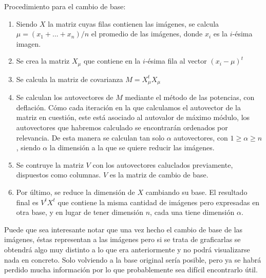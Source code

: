 \bigskip

Procedimiento para el cambio de base:

\begin{enumerate}
\item Siendo $X$ la matriz cuyas filas contienen las imágenes, se calcula $\mu = (x_1 + ... + x_n)/n$ el promedio de las imágenes, donde $x_i$ es la $i$-ésima imagen.
\item Se crea la matriz $X_\mu$ que contiene en la $i$-ésima fila al vector $(x_i - \mu)^t$
\item Se calcula la matriz de covarianza $M = X_\mu^tX_\mu$
\item Se calculan los autovectores de $M$ mediante el método de las potencias, con deflación. Cómo cada iteración en la que calculamos el autovector de la matriz en cuestión, este está asociado al autovalor de máximo módulo, los autovectores que habremos calculado se encontrarán ordenados por relevancia. De esta manera se calculan tan solo $\alpha$ autovectores, con $1 \geq \alpha \geq n$, siendo $\alpha$ la dimensión a la que se quiere reducir las imágenes.
\item Se contruye la matriz $V$ con los autovectores caluclados previamente, dispuestos como columnas. $V$ es la matriz de cambio de base.
\item Por último, se reduce la dimensión de $X$ cambiando su base. El resultado final es $V^tX^t$ que contiene la misma cantidad de imágenes pero expresadas en otra base, y en lugar de tener dimensión $n$, cada una tiene dimensión $\alpha$.
\end{enumerate}\tabularnewline

Puede que sea interesante notar que una vez hecho el cambio de base de las imágenes, éstas representan a las imágenes pero si se trata de graficarlas se obtendrá algo muy distinto a lo que era anteriormente y no podrá visualizarse nada en concreto. Solo volviendo a la base original sería posible, pero ya se habrá perdido mucha información por lo que probablemente sea difícil encontrarlo útil.

